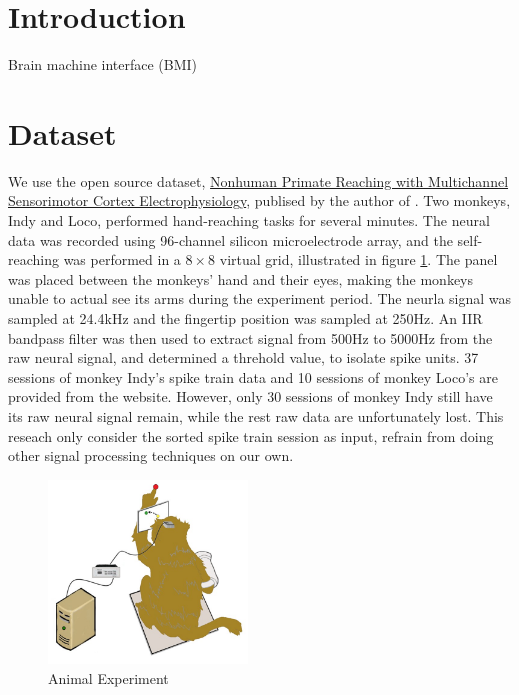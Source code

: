 \documentclass[8pt,a4paper]{article}
\begin{document}
\begin{multicols}{2}

\section*{Introduction}

Brain machine interface (BMI) 

\section*{Dataset}

We use the open source dataset, \href{https://zenodo.org/record/583331#.XWirEigzZPb}{Nonhuman Primate Reaching with Multichannel Sensorimotor Cortex Electrophysiology}, 
publised by the author of \cite{makin2018}. Two monkeys, Indy and Loco, performed hand-reaching tasks for several minutes. 
The neural data was recorded using 96-channel silicon microelectrode array, and the self-reaching was performed in a  $8 \times 8$ virtual grid, illustrated in figure \ref{fig:monkey_drawing}.
The panel was placed between the monkeys' hand and their eyes, making the monkeys unable to actual see its arms during the experiment period. 
The neurla signal was sampled at 24.4kHz and the fingertip position was sampled at 250Hz. 
An IIR bandpass filter was then used to extract signal from 500Hz to 5000Hz from the raw neural signal, and determined a threhold value, to isolate spike units. 
37 sessions of monkey Indy's spike train data and 10 sessions of monkey Loco's are provided from the website.  
However, only 30 sessions of monkey Indy still have its raw neural signal remain, while the rest raw data are unfortunately lost. 
This reseach only consider the sorted spike train session as input, refrain from doing other signal processing techniques on our own.


\begin{figure}[H]
  \begin{center}
      \includegraphics[width=150pt]{./Figures/monkey.jpg}
      \caption{Animal Experiment}
      \label{fig:monkey_drawing}
  \end{center}
\end{figure}



\end{multicols}
\end{document}
